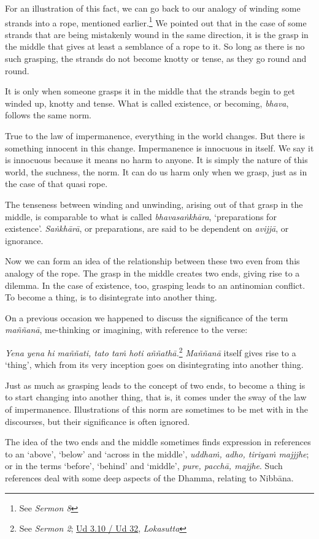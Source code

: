 For an illustration of this fact, we can go back to our analogy of winding some strands into a rope, mentioned earlier.\footnote{See \emph{Sermon 8}} We pointed out that in the case of some strands that are being mistakenly wound in the same direction, it is the grasp in the middle that gives at least a semblance of a rope to it. So long as there is no such grasping, the strands do not become knotty or tense, as they go round and round.

It is only when someone grasps it in the middle that the strands begin to get winded up, knotty and tense. What is called existence, or becoming, \emph{bhava}, follows the same norm.

True to the law of impermanence, everything in the world changes. But there is something innocent in this change. Impermanence is innocuous in itself. We say it is innocuous because it means no harm to anyone. It is simply the nature of this world, the suchness, the norm. It can do us harm only when we grasp, just as in the case of that quasi rope.

The tenseness between winding and unwinding, arising out of that grasp in the middle, is comparable to what is called \emph{bhavasaṅkhāra}, `preparations for existence'. \emph{Saṅkhārā}, or preparations, are said to be dependent on \emph{avijjā}, or ignorance.

Now we can form an idea of the relationship between these two even from this analogy of the rope. The grasp in the middle creates two ends, giving rise to a dilemma. In the case of existence, too, grasping leads to an antinomian conflict. To become a thing, is to disintegrate into another thing.

On a previous occasion we happened to discuss the significance of the term \emph{maññanā}, me-thinking or imagining, with reference to the verse:

\emph{Yena yena hi maññati, tato taṁ hoti aññathā.}\footnote{See \emph{Sermon 2}; \href{https://suttacentral.net/ud3.10/pli/ms}{Ud 3.10 / Ud 32}, \emph{Lokasutta}} \emph{Maññanā} itself gives rise to a `thing', which from its very inception goes on disintegrating into another thing.

Just as much as grasping leads to the concept of two ends, to become a thing is to start changing into another thing, that is, it comes under the sway of the law of impermanence. Illustrations of this norm are sometimes to be met with in the discourses, but their significance is often ignored.

The idea of the two ends and the middle sometimes finds expression in references to an `above', `below' and `across in the middle', \emph{uddhaṁ, adho, tiriyaṁ majjjhe}; or in the terms `before', `behind' and `middle', \emph{pure, pacchā, majjhe}. Such references deal with some deep aspects of the Dhamma, relating to Nibbāna.

